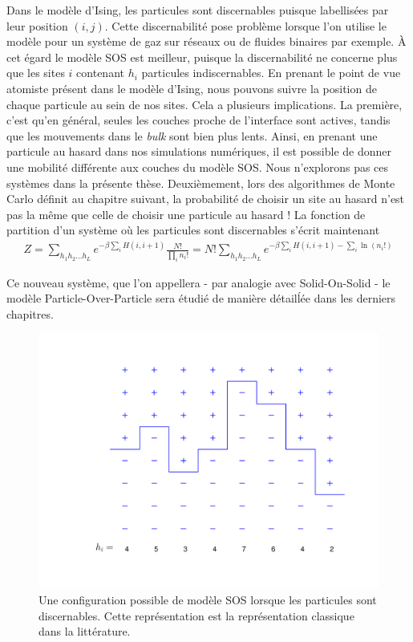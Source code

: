 Dans le modèle d'Ising, les particules sont discernables puisque labellisées par leur position $(i,j)$. Cette discernabilité pose problème lorsque l'on utilise le modèle pour un système de gaz sur réseaux ou de fluides binaires par exemple. À cet égard le modèle SOS est meilleur, puisque la discernabilité ne concerne plus que les sites $i$ contenant $h_i$ particules indiscernables. 
En prenant le point de vue atomiste présent dans le modèle d'Ising, nous pouvons suivre la position de chaque particule au sein de nos sites. Cela a plusieurs implications.
La première, c'est qu'en général, seules les couches proche de l'interface sont actives, tandis que les mouvements dans le \textit{bulk} sont bien plus lents. Ainsi, en prenant une particule au hasard dans nos simulations numériques, il est possible de donner une mobilité différente aux couches du modèle SOS. Nous n'explorons pas ces systèmes dans la présente thèse. 
Deuxièmement, lors des algorithmes de Monte Carlo définit au chapitre suivant, la probabilité de choisir un site au hasard n'est pas la même que celle de choisir une particule au hasard ! 
La fonction de partition d'un système où les particules sont discernables s'écrit maintenant
\begin{align}
	Z = \sum_{h_1 h_2 ... h_L} e^{- \beta \sum_{i} H(i,i+1)} \frac{N!}{\prod_i n_i!} = N! \sum_{h_1 h_2 ... h_L} e^{- \beta \sum_{i} H(i,i+1) -\sum_i \ln(n_i!)}
\end{align}

Ce nouveau système, que l'on appellera - par analogie avec Solid-On-Solid - le modèle Particle-Over-Particle sera étudié de manière détailĺée dans les derniers chapitres.

\begin{figure}[h]
	\centering
	\includegraphics[width=0.7\linewidth]{isingtosos/figure-sos.pdf}
	\caption{Une configuration possible de modèle SOS lorsque les particules sont discernables. Cette représentation est la représentation classique dans la littérature.}
\end{figure}



